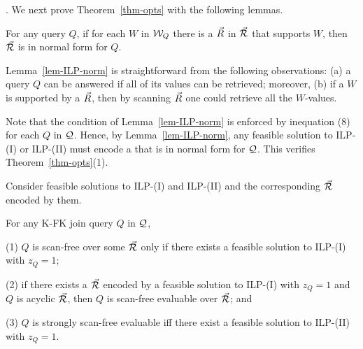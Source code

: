 {\begin{example}\label{exa-opts}
\end{example}



. We next prove Theorem~\ref{thm-opts} with the following lemmas. 



\begin{lemma}\label{lem-ILP-norm}
  For any \SQL query $Q$, if for each \qcs $W$ in $\mathcal{W}_{Q}$ there
  is a \bs $\vec{R}$ in $\vec{{\mathcal R}}$ that supports $W$, then
  $\vec{{\mathcal R}}$ is in normal form for $Q$. 
\end{lemma}

Lemma~\ref{lem-ILP-norm} is straightforward from the following observations:
(a) a query $Q$ can be answered if all of its \qcs values can be
retrieved; moreover,
(b) if a \qcs $W$ is supported by a \bs $\vec{R}$, then by scanning
$\vec{R}$ one could retrieve all the $W$-values. 

Note that the condition of Lemma~\ref{lem-ILP-norm} is enforced
by inequation (8) for each $Q$ in $\mathcal Q$.
Hence, by Lemma~\ref{lem-ILP-norm}, any feasible solution to ILP-(I)
or ILP-(II) must encode a \bds that is in normal form for $\mathcal Q$.
This verifies Theorem~\ref{thm-opts}(1). 


\vspace{1ex}
Consider feasible solutions to ILP-(I) and ILP-(II) and the
corresponding \bdss $\vec{{\mathcal R}}$ encoded by them.

\vspace{-0.5ex}
\begin{lemma}\label{lem-ILP}
  For any K-FK join \SPC query $Q$ in $\mathcal Q$, 

  \sstab (1) $Q$ is scan-free over some \bds $\vec{{\mathcal R}}$ only if there exists a feasible
  solution to ILP-(I) with $z_{Q} = 1$; 

  \sstab (2) if there exists a \bds $\vec{{\mathcal R}}$ encoded by a feasible
  solution to ILP-(I) with $z_{Q} = 1$ and $Q$ is acyclic \wrt
  $\vec{{\mathcal R}}$, then $Q$ is scan-free evaluable over $\vec{{\mathcal R}}$; and

  \sstab (3) $Q$ is strongly scan-free evaluable iff there exist a
  feasible solution to ILP-(II) with $z_{Q} = 1$. 
\end{lemma}

}
